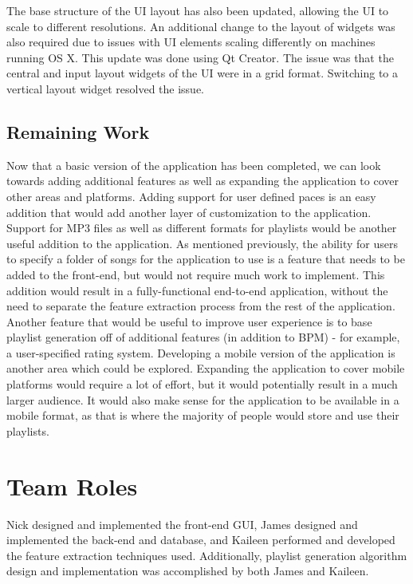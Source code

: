 \documentclass{article}
\begin{document}
The base structure of the UI layout has also been updated, allowing the UI to scale to different resolutions. An additional change to the layout of widgets was also required due to issues with UI elements scaling differently on machines running OS X. This update was done using Qt Creator. The issue was that the central and input layout widgets of the UI were in a grid format. Switching to a vertical layout widget resolved the issue.

\subsection{Remaining Work}
Now that a basic version of the application has been completed, we can look towards adding additional features as well as expanding the application to cover other areas and platforms. Adding support for user defined paces is an easy addition that would add another layer of customization to the application. Support for MP3 files as well as different formats for playlists would be another useful addition to the application. As mentioned previously, the ability for users to specify a folder of songs for the application to use is a feature that needs to be added to the front-end, but would not require much work to implement. This addition would result in a fully-functional end-to-end application, without the need to separate the feature extraction process from the rest of the application. Another feature that would be useful to improve user experience is to base playlist generation off of additional features (in addition to BPM) - for example, a user-specified rating system. Developing a mobile version of the application is another area which could be explored. Expanding the application to cover mobile platforms would require a lot of effort, but it would potentially result in a much larger audience. It would also make sense for the application to be available in a mobile format, as that is where the majority of people would store and use their playlists.

\section{Team Roles}
Nick designed and implemented the front-end GUI, James designed and implemented the back-end and database, and Kaileen performed and developed the feature extraction techniques used. Additionally, playlist generation algorithm design and implementation was accomplished by both James and Kaileen.
\end{document}
